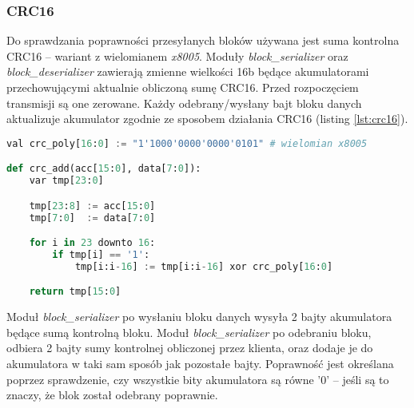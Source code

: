 \subsubsection{CRC16}
\label{sec:crc16}
Do sprawdzania poprawności przesyłanych bloków używana jest suma kontrolna CRC16 -- wariant z wielomianem \textit{x8005}. Moduły \textit{block\_serializer} oraz \textit{block\_deserializer} zawierają zmienne wielkości 16b będące akumulatorami przechowującymi aktualnie obliczoną sumę CRC16. Przed rozpoczęciem transmisji są one zerowane. Każdy odebrany/wysłany bajt bloku danych aktualizuje akumulator zgodnie ze sposobem działania CRC16 (listing \ref{lst:crc16}). 

\begin{lstlisting}[language=Python, basicstyle=\ttfamily, autogobble=true, tabsize=3, morekeywords={downto, val, var}, captionpos=b, caption={Algorytm dodawania bajtu do akumulatora sumy kontrolnej CRC16}, label={lst:crc16}]
val crc_poly[16:0] := "1'1000'0000'0000'0101" # wielomian x8005

def crc_add(acc[15:0], data[7:0]):
	var tmp[23:0]

	tmp[23:8] := acc[15:0]
	tmp[7:0]  := data[7:0]

	for i in 23 downto 16:
		if tmp[i] == '1':
			tmp[i:i-16] := tmp[i:i-16] xor crc_poly[16:0]

	return tmp[15:0]
\end{lstlisting}

Moduł \textit{block\_serializer} po wysłaniu bloku danych wysyła 2 bajty akumulatora będące sumą kontrolną bloku. Moduł \textit{block\_serializer} po odebraniu bloku, odbiera 2 bajty sumy kontrolnej obliczonej przez klienta, oraz dodaje je do akumulatora w taki sam sposób jak pozostałe bajty. Poprawność jest określana poprzez sprawdzenie, czy wszystkie bity akumulatora są równe {'0'} -- jeśli są to znaczy, że blok został odebrany poprawnie.